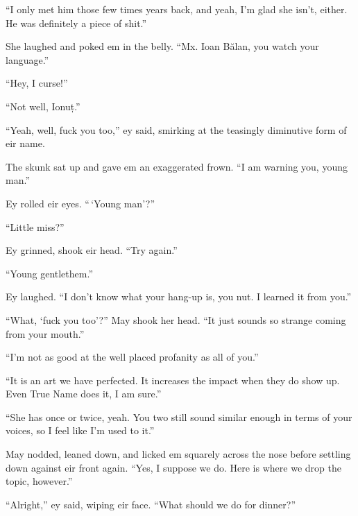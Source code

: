 ``I only met him those few times years back, and yeah, I'm glad she isn't, either. He was definitely a piece of shit.''

She laughed and poked em in the belly. ``Mx. Ioan Bălan, you watch your language.''

``Hey, I curse!''

``Not well, Ionuț.''

``Yeah, well, fuck you too,'' ey said, smirking at the teasingly diminutive form of eir name.

The skunk sat up and gave em an exaggerated frown. ``I am warning you, young man.''

Ey rolled eir eyes. ``\,`Young man'?''

``Little miss?''

Ey grinned, shook eir head. ``Try again.''

``Young gentlethem.''

Ey laughed. ``I don't know what your hang-up is, you nut. I learned it from you.''

``What, `fuck you too'?'' May shook her head. ``It just sounds so strange coming from your mouth.''

``I'm not as good at the well placed profanity as all of you.''

``It is an art we have perfected. It increases the impact when they do show up. Even True Name does it, I am sure.''

``She has once or twice, yeah. You two still sound similar enough in terms of your voices, so I feel like I'm used to it.''

May nodded, leaned down, and licked em squarely across the nose before settling down against eir front again. ``Yes, I suppose we do. Here is where we drop the topic, however.''

``Alright,'' ey said, wiping eir face. ``What should we do for dinner?''
